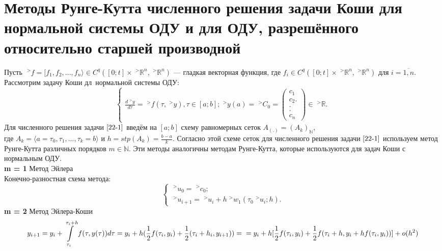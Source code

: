 \documentclass[__main__.tex]{subfiles}
\begin{document}
\section{Методы Рунге-Кутта численного решения задачи Коши для нормальной системы ОДУ и для ОДУ, разрешённого относительно старшей производной}

Пусть $\;^>f = [f_1, f_2, ...,  f_n\rangle \in C^q([0; t] \times \;^>\mathbb{R}^n, \;^>\mathbb{R}^n)$ — гладкая векторная функция, где $f_i \in C^q([0; t] \times \;^>\mathbb{R}^n, \;^>\mathbb{R}^n)$ для $i = \overline{1, n}$.\\
Рассмотрим задачу Коши дл\ нормальной системы ОДУ:
\begin{equation}
	\begin{cases}
	\frac{d\;^>y}{d\tau} = \;^>f(\tau, \;^>y), \tau \in [a; b];
	\;^>y(a) = \;^>C_0 =
	\begin{pmatrix}
	c_1\\
	c_2
	.\\
	.\\
	.\\
	c_n
	\end{pmatrix}
	\in \;^>\mathbb{R}.
	\end{cases}
	\label{22-1}
\end{equation}
Для численного решения задачи $\ref{22-1}$ введём на $[a; b]$ схему равномерных сеток $A_{(.)} = (A_k)_{\mathbb{N}}$,\\
где $A_k = \langle a = \tau_0, \tau_1, ..., \tau_k = b\rangle$ и $h = stp(A_k) = \frac{b-a}{k}$. Согласно этой схеме сеток для численного решения задачи $\ref{22-1}$ используем метод Рунге-Кутта различных порядков $m \in \mathbb{N}$. Эти методы аналогичны методам Рунге-Кутта, которые используются для задач Коши с нормальным ОДУ.\\
\textbf{m = 1} Метод Эйлера\\
Конечно-разностная схема метода:
\begin{equation}
	\begin{cases}
	\;^>u_0 = \;^>c_0;\\
	\;^>u_{i+1} = \;^>u_i + h \;^>w_1(\tau_0 \;^>u_i; h).
	\end{cases}
	\label{22-2}
\end{equation}
\textbf{m = 2} Метод Эйлера-Коши
\begin{equation}
	y_{i+1} = y_i + \int \limits_{\tau_i}^{\tau_i + h} f(\tau, y(\tau))d\tau = y_i + h(\frac{1}{2}f(\tau_i, y_i) + \frac{1}{2}(\tau_i + h_i, y_{i+1})) =\\
	= y_i + h[\frac{1}{2}f(\tau_i, y_i) + \frac{1}{2}f(\tau_i+h, y_i+hf(\tau_i, y_i))] + o(h^2)
\end{equation}
\end{document}
